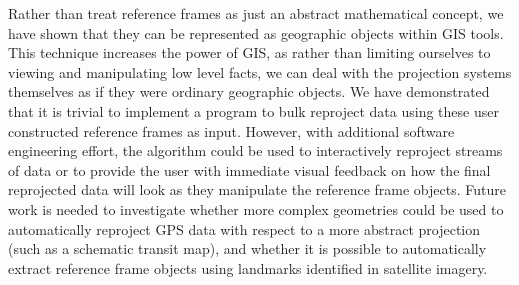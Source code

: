 Rather than treat reference frames as just an abstract mathematical concept, we have shown that they can be represented as geographic objects within GIS tools. This technique increases the power of GIS, as rather than limiting ourselves to viewing and manipulating low level facts, we can deal with the projection systems themselves as if they were ordinary geographic objects. We have demonstrated that it is trivial to implement a program to bulk reproject data using these user constructed reference frames as input. However, with additional software engineering effort, the algorithm could be used to interactively reproject streams of data or to provide the user with immediate visual feedback on how the final reprojected data will look as they manipulate the reference frame objects. Future work is needed to investigate whether more complex geometries could be used to automatically reproject GPS data with respect to a more abstract projection (such as a schematic transit map), and whether it is possible to automatically extract reference frame objects using landmarks identified in satellite imagery.






